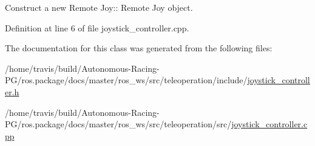 Construct a new Remote Joy\+:\+: Remote Joy object. 



Definition at line 6 of file joystick\+\_\+controller.\+cpp.



The documentation for this class was generated from the following files\+:\begin{DoxyCompactItemize}
\item 
/home/travis/build/\+Autonomous-\/\+Racing-\/\+P\+G/ros.\+package/docs/master/ros\+\_\+ws/src/teleoperation/include/\hyperlink{joystick__controller_8h}{joystick\+\_\+controller.\+h}\item 
/home/travis/build/\+Autonomous-\/\+Racing-\/\+P\+G/ros.\+package/docs/master/ros\+\_\+ws/src/teleoperation/src/\hyperlink{joystick__controller_8cpp}{joystick\+\_\+controller.\+cpp}\end{DoxyCompactItemize}
